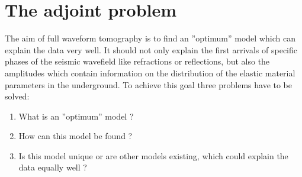 \chapter{The adjoint problem}

The aim of full waveform tomography is to find an ''optimum'' model which can explain the data very well. It should not only explain the 
first arrivals of specific phases of the seismic wavefield like refractions or reflections, but also the amplitudes which contain information 
on the distribution of the elastic material parameters in the underground. To achieve this goal three problems have to be solved:
\begin{enumerate}
\item What is an ''optimum'' model ?
\item How can this model be found ?
\item Is this model unique or are other models existing, which could explain the data equally well ?   
\end{enumerate}
